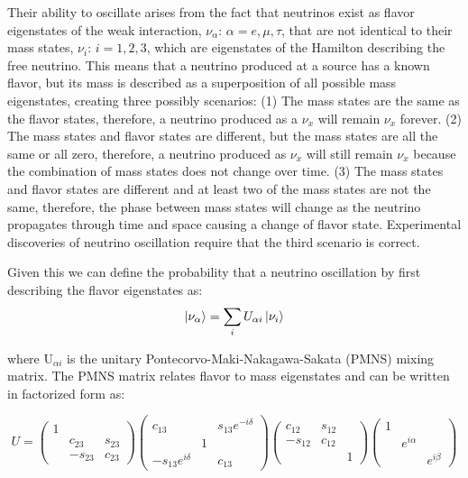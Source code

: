 Their ability to oscillate arises from the fact that neutrinos exist as flavor eigenstates of the weak interaction, $\nu_\alpha$: $\alpha = e, \mu, \tau$, that are not identical to their mass states, $\nu_i$: $i = 1, 2, 3$, which are eigenstates of the Hamilton describing the free neutrino.
This means that a neutrino produced at a source has a known flavor, but its mass is described as a superposition of all possible mass eigenstates, creating three possibly scenarios:
(1) The mass states are the same as the flavor states, therefore, a neutrino produced as a $\nu_x$ will remain $\nu_x$ forever. 
(2) The mass states and flavor states are different, but the mass states are all the same or all zero, therefore, a neutrino produced as $\nu_x$ will still remain $\nu_x$ because the combination of mass states does not change over time. 
(3) The mass states and flavor states are different and at least two of the mass states are not the same, therefore, the phase between mass states will change as the neutrino propagates through time and space causing a change of flavor state.
Experimental discoveries of neutrino oscillation require that the third scenario is correct.

Given this we can define the probability that a neutrino oscillation by first describing the flavor eigenstates as:
\begin{equation}
	\ket{\nu_\alpha} = \sum_{i}U_{\alpha i}\ket{\nu_i}
\end{equation}

\noindent where U$_{\alpha i}$ is the unitary Pontecorvo-Maki-Nakagawa-Sakata (PMNS) mixing matrix. 
The PMNS matrix relates flavor to mass eigenstates and can be written in factorized form as:

\begin{equation}	
	U = 
	\begin{pmatrix}
		1 & & \\
		& c_{23} & s_{23} \\
		& -s_{23} & c_{23}
	\end{pmatrix}
	\begin{pmatrix}
		c_{13} & & s_{13}e^{-i\delta} \\
		& 1 &	\\
		-s_{13}e^{i\delta} & & c_{13}
	\end{pmatrix}
	\begin{pmatrix}
		c_{12} & s_{12} & \\
		-s_{12} & c_{12} & \\
		& & 1
	\end{pmatrix}
	\begin{pmatrix}
		1 & & \\
		& e^{i\alpha}  & \\
		& & e^{i\beta}
	\end{pmatrix}
\end{equation}

